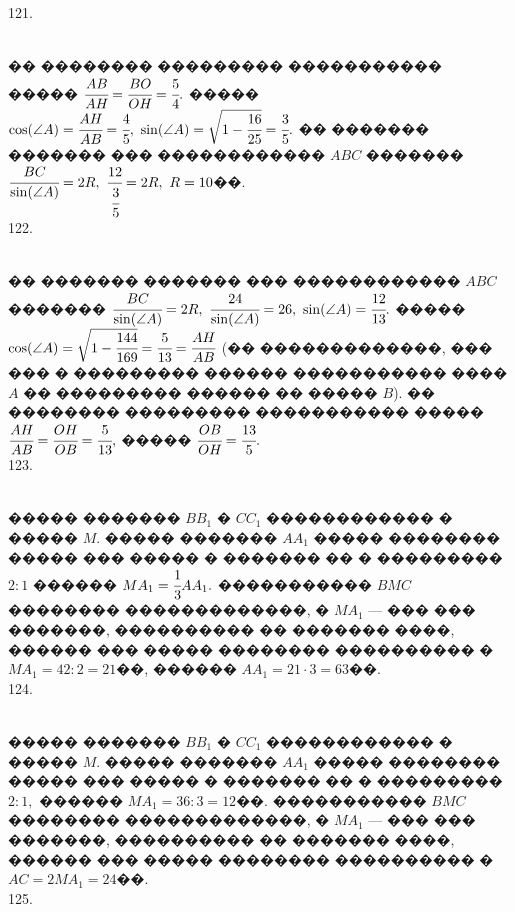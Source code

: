 \documentclass[12pt]{article}
\begin{document}
121. \begin{figure}[ht!]
\end{figure}\\
�� �������� ��������� ����������� ����� $\cfrac{AB}{AH}=\cfrac{BO}{OH}=\cfrac{5}{4}.$ ����� $\cos(\angle A)=\cfrac{AH}{AB}=\cfrac{4}{5},\ \sin(\angle A)=\sqrt{1-\cfrac{16}{25}}=\cfrac{3}{5}.$ �� ������� ������� ��� ������������ $ABC$ ������� $\cfrac{BC}{\sin(\angle A)}=2R,\ \cfrac{12}{\cfrac{3}{5}}=2R,\ R=10$��.\\
122. \begin{figure}[ht!]
\end{figure}\\
�� ������� ������� ��� ������������ $ABC$ ������� $\cfrac{BC}{\sin(\angle A)}=2R,\ \cfrac{24}{\sin(\angle A)}=26,\ \sin(\angle A)=\cfrac{12}{13}.$
����� $\cos(\angle A)=\sqrt{1-\cfrac{144}{169}}=\cfrac{5}{13}=\cfrac{AH}{AB}$ (�� �������������, ��� ��� � ��������� ������ ����������� ���� $A$ �� ��������� ������ �� ����� $B$). �� �������� ��������� ����������� ����� $\cfrac{AH}{AB}=\cfrac{OH}{OB}=\cfrac{5}{13},$ ����� $\cfrac{OB}{OH}=\cfrac{13}{5}.$\\
123. \begin{figure}[ht!]
\end{figure}\\
����� ������� $BB_1$ � $CC_1$ ������������ � ����� $M.$ ����� ������� $AA_1$ ����� �������� ����� ��� ����� � ������� �� � ��������� $2:1$ ������ $MA_1=\cfrac{1}{3}AA_1.$ ����������� $BMC$ �������� �������������, � $MA_1$ --- ��� ��� �������, ���������� �� ������� ����, ������ ��� ����� �������� ���������� � $MA_1=42:2=21$��, ������ $AA_1=21\cdot3=63$��.\\
124. \begin{figure}[ht!]
\end{figure}\\
����� ������� $BB_1$ � $CC_1$ ������������ � ����� $M.$ ����� ������� $AA_1$ ����� �������� ����� ��� ����� � ������� �� � ��������� $2:1,$ ������ $MA_1=36:3=12$��. ����������� $BMC$ �������� �������������, � $MA_1$ --- ��� ��� �������, ���������� �� ������� ����, ������ ��� ����� �������� ���������� � $AC=2MA_1=24$��.\\
125. \begin{figure}[ht!]
\end{figure}\\
\end{document}
